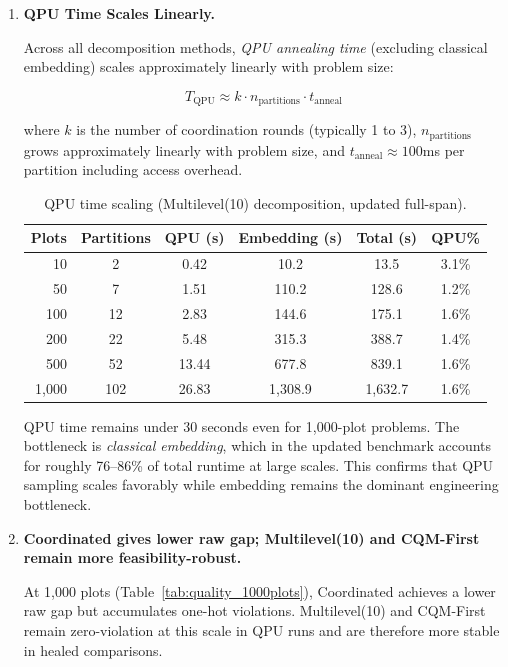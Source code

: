 \documentclass{oqireport}
\begin{document}
\begin{enumerate}[label=\textbf{Result \arabic*.}, leftmargin=*, align=left, itemsep=1em]

\item \textbf{QPU Time Scales Linearly.}

Across all decomposition methods, \textit{QPU annealing time} (excluding classical embedding) scales approximately linearly with problem size:

\begin{equation}
T_{\text{QPU}} \approx k \cdot n_{\text{partitions}} \cdot t_{\text{anneal}}
\end{equation}

where $k$ is the number of coordination rounds (typically 1 to 3), $n_{\text{partitions}}$ grows approximately linearly with problem size, and $t_{\text{anneal}} \approx 100$ms per partition including access overhead.

\begin{table}[H]
\centering
\caption{QPU time scaling (Multilevel(10) decomposition, updated full-span).}
\label{tab:qpu_time_scaling}
\begin{tabular}{rccccc}
\toprule
\textbf{Plots} & \textbf{Partitions} & \textbf{QPU (s)} & \textbf{Embedding (s)} & \textbf{Total (s)} & \textbf{QPU\%} \\
\midrule
10 & 2 & 0.42 & 10.2 & 13.5 & 3.1\% \\
50 & 7 & 1.51 & 110.2 & 128.6 & 1.2\% \\
100 & 12 & 2.83 & 144.6 & 175.1 & 1.6\% \\
200 & 22 & 5.48 & 315.3 & 388.7 & 1.4\% \\
500 & 52 & 13.44 & 677.8 & 839.1 & 1.6\% \\
1,000 & 102 & 26.83 & 1,308.9 & 1,632.7 & 1.6\% \\
\bottomrule
\end{tabular}
\end{table}

QPU time remains under 30 seconds even for 1,000-plot problems. The bottleneck is \textit{classical embedding}, which in the updated benchmark accounts for roughly 76--86\% of total runtime at large scales. This confirms that QPU sampling scales favorably while embedding remains the dominant engineering bottleneck.

\item \textbf{Coordinated gives lower raw gap; Multilevel(10) and CQM-First remain more feasibility-robust.}

At 1,000 plots (Table~\ref{tab:quality_1000plots}), Coordinated achieves a lower raw gap but accumulates one-hot violations. Multilevel(10) and CQM-First remain zero-violation at this scale in QPU runs and are therefore more stable in healed comparisons.


\end{enumerate}
\end{document}
